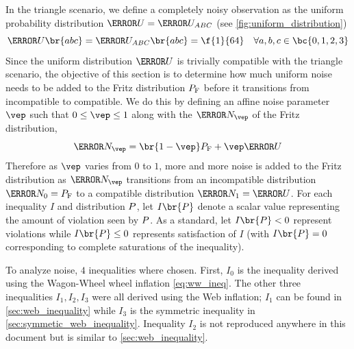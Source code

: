 \documentclass[aps, 10pt, english, twoside, pra, nofootinbib, tightenlines, longbibliography]{revtex4-1}
\begin{document}
    In the triangle scenario, we define a completely noisy observation as the uniform probability distribution $\s{U} = \s{U}_{ABC}$ (see \cref{fig:uniform_distribution})
    \[ \s{U}\br{abc} = \s{U}_{ABC}\br{abc} = \f{1}{64} \quad \forall a,b,c\in \bc{0,1,2,3}  \]
    Since the uniform distribution $\s{U}$ is trivially compatible with the triangle scenario, the objective of this section is to determine how much uniform noise needs to be added to the Fritz distribution $\prob[\fritz]$ before it transitions from incompatible to compatible. We do this by defining an affine noise parameter $\vep$ such that $0 \leq \vep \leq 1$ along with the  $\s{N}_{\vep}$ of the Fritz distribution,
    \[ \s{N}_{\vep} = \br{1 - \vep} \prob[\fritz] + \vep \s{U} \]
    Therefore as $\vep$ varies from $0$ to $1$, more and more noise is added to the Fritz distribution as $\s{N}_{\vep}$ transitions from an incompatible distribution $\s{N}_{0} = \prob[\fritz]$ to a compatible distribution $\s{N}_{1} = \s{U}$. For each inequality $I$ and distribution $\prob$, let $I\br{\prob}$ denote a scalar value representing the amount of violation seen by $\prob$. As a standard, let $I\br{\prob} < 0$ represent violations while $I\br{\prob} \leq 0$ represents satisfaction of $I$ (with $I\br{\prob} = 0$ corresponding to complete saturations of the inequality).

    To analyze noise, $4$ inequalities where chosen. First, $I_0$ is the inequality derived using the Wagon-Wheel wheel inflation \cref{eq:ww_ineq}. The other three inequalities $I_1, I_2, I_3$ were all derived using the Web inflation; $I_1$ can be found in \cref{sec:web_inequality} while $I_3$ is the symmetric inequality in \cref{sec:symmetic_web_inequality}. Inequality $I_2$ is not reproduced anywhere in this document but is similar to \cref{sec:web_inequality}.
\end{document}
